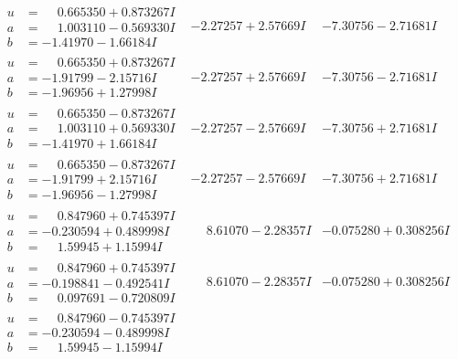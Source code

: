 \documentclass[1p]{elsarticle_modified}
\theoremstyle{definition}
\begin{document}
$$\begin{array}{c|c|c}
\begin{aligned}
u &= \phantom{-}0.665350 + 0.873267 I \\
a &= \phantom{-}1.003110 - 0.569330 I \\
b &= -1.41970 - 1.66184 I\end{aligned}
 & -2.27257 + 2.57669 I & -7.30756 - 2.71681 I \\ \hline\begin{aligned}
u &= \phantom{-}0.665350 + 0.873267 I \\
a &= -1.91799 - 2.15716 I \\
b &= -1.96956 + 1.27998 I\end{aligned}
 & -2.27257 + 2.57669 I & -7.30756 - 2.71681 I \\ \hline\begin{aligned}
u &= \phantom{-}0.665350 - 0.873267 I \\
a &= \phantom{-}1.003110 + 0.569330 I \\
b &= -1.41970 + 1.66184 I\end{aligned}
 & -2.27257 - 2.57669 I & -7.30756 + 2.71681 I \\ \hline\begin{aligned}
u &= \phantom{-}0.665350 - 0.873267 I \\
a &= -1.91799 + 2.15716 I \\
b &= -1.96956 - 1.27998 I\end{aligned}
 & -2.27257 - 2.57669 I & -7.30756 + 2.71681 I \\ \hline\begin{aligned}
u &= \phantom{-}0.847960 + 0.745397 I \\
a &= -0.230594 + 0.489998 I \\
b &= \phantom{-}1.59945 + 1.15994 I\end{aligned}
 & \phantom{-}8.61070 - 2.28357 I & -0.075280 + 0.308256 I \\ \hline\begin{aligned}
u &= \phantom{-}0.847960 + 0.745397 I \\
a &= -0.198841 - 0.492541 I \\
b &= \phantom{-}0.097691 - 0.720809 I\end{aligned}
 & \phantom{-}8.61070 - 2.28357 I & -0.075280 + 0.308256 I \\ \hline\begin{aligned}
u &= \phantom{-}0.847960 - 0.745397 I \\
a &= -0.230594 - 0.489998 I \\
b &= \phantom{-}1.59945 - 1.15994 I\end{aligned}

\end{array}$$
\end{document}
